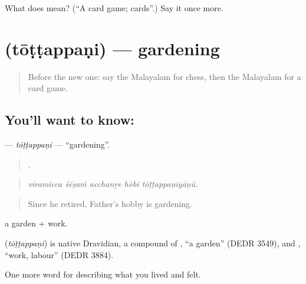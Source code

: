\begin{tcolorbox}[breakable,colback=teal!4,colframe=teal!35!black,title={Before you move on}]
What does  mean? (\textquotedblleft{}A card game; cards\textquotedblright{}.) Say it once more.
\end{tcolorbox}
\section[\texorpdfstring{\ml{തോട്ടപ്പണി} (tōṭṭappaṇi)}{തോട്ടപ്പണി (tōṭṭappaṇi)}]{ (tōṭṭappaṇi) — gardening}

\label{lesson:ML-C566-tottappani}



\begin{quote}
Before the new one: say the Malayalam for chess, then the Malayalam for a card game.
\end{quote}

\subsection*{You'll want to know: }
\textbf{} — \emph{tōṭṭappaṇi} — \textquotedblleft{}gardening\textquotedblright{}.

\begin{quote}
    .
\end{quote}

\begin{quote}
\emph{viramicca śēṣaṁ acchanṟe hōbi tōṭṭappaṇiyāṇŭ.}
\end{quote}

\begin{quote}
Since he retired, Father's hobby is gardening.
\end{quote}

 a garden +  work.

\begin{cousinweb}
\textbf{} (\emph{tōṭṭappaṇi}) is native Dravidian, a compound of , \textquotedblleft{}a garden\textquotedblright{} (DEDR 3549), and , \textquotedblleft{}work, labour\textquotedblright{} (DEDR 3884).
\end{cousinweb}

\begin{grammarlens}[title={What you've built}]
One more word for describing what you lived and felt.
\end{grammarlens}

